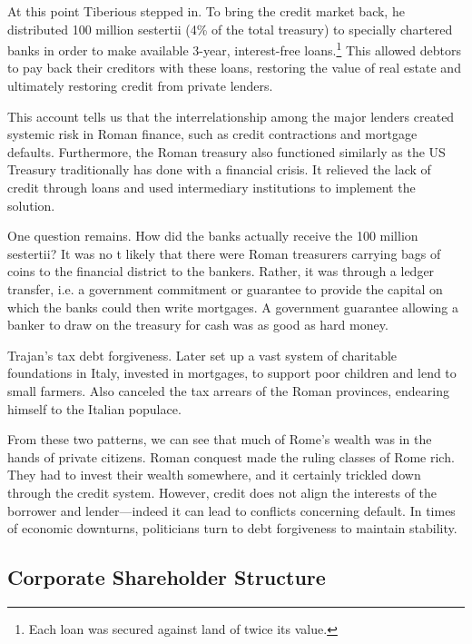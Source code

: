 \documentclass{article}
\begin{document}
      At this point Tiberious stepped in. To bring the credit market back, he distributed 100 million sestertii (4\% of the total treasury) to specially chartered banks in order to make available 3-year, interest-free loans.\footnote{Each loan was secured against land of twice its value.} This allowed debtors to pay back their creditors with these loans, restoring the value of real estate and ultimately restoring credit from private lenders. 

      This account tells us that the interrelationship among the major lenders created systemic risk in Roman finance, such as credit contractions and mortgage defaults. Furthermore, the Roman treasury also functioned similarly as the US Treasury traditionally has done with a financial crisis. It relieved the lack of credit through loans and used intermediary institutions to implement the solution. 
      
      One question remains. How did the banks actually receive the 100 million sestertii? It was no t likely that there were Roman treasurers carrying bags of coins to the financial district to the bankers. Rather, it was through a ledger transfer, i.e. a government commitment or guarantee to provide the capital on which the banks could then write mortgages. A government guarantee allowing a banker to draw on the treasury for cash was as good as hard money. 

      \begin{example}
        Trajan's tax debt forgiveness. Later set up a vast system of charitable foundations in Italy, invested in mortgages, to support poor children and lend to small farmers. Also canceled the tax arrears of the Roman provinces, endearing himself to the Italian populace. 
      \end{example}

      From these two patterns, we can see that much of Rome's wealth was in the hands of private citizens. Roman conquest made the ruling classes of Rome rich. They had to invest their wealth somewhere, and it certainly trickled down through the credit system. However, credit does not align the interests of the borrower and lender—indeed it can lead to conflicts concerning default. In times of economic downturns, politicians turn to debt forgiveness to maintain stability.

  \subsection{Corporate Shareholder Structure}
\end{document}
